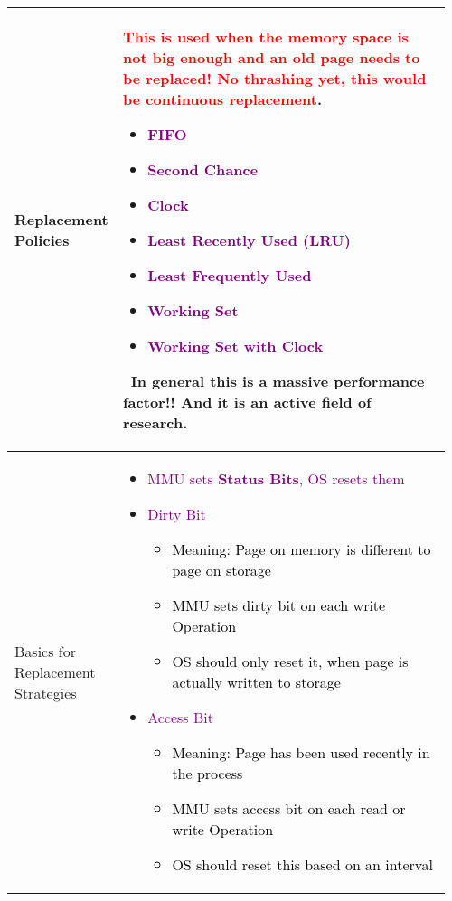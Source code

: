 \documentclass[main.tex,fontsize=8pt,paper=a4,paper=portrait,DIV=calc,]{scrartcl}
\begin{document}
\begin{table}[ht!]
\begin{tabular}{|m{0.2\linewidth}|m{0.755\linewidth}|}
\hline
Replacement Policies & 
\textcolor{red}{This is used when the memory space is not big enough and an old page needs to be replaced! \textbf{No thrashing yet, this would be continuous replacement}}.\newline
\begin{itemize}
\item \textcolor{purple}{FIFO}
\item \textcolor{purple}{Second Chance}
\item \textcolor{purple}{Clock}
\item \textcolor{purple}{Least Recently Used (LRU)}
\item \textcolor{purple}{Least Frequently Used}
\item \textcolor{purple}{Working Set}
\item \textcolor{purple}{Working Set with Clock}
\vspace{-3mm}
\end{itemize}
\, \newline
In general this is \textbf{a massive performance factor!!} And it is an active field of research.\\
\hline
Basics for Replacement Strategies &
\vspace{2mm}
\begin{itemize}
\item \textcolor{purple}{MMU sets \textbf{Status Bits}, OS resets them}
\item \textcolor{purple}{Dirty Bit}\newline
\begin{itemize}
  \item \textcolor{black}{Meaning: Page on memory is different to page on storage}
\item \textcolor{black}{MMU sets dirty bit on each write Operation}
\item \textcolor{black}{OS should only reset it, when page is actually written to storage}
\end{itemize}
\item \textcolor{purple}{Access Bit}\newline
\begin{itemize}
\item \textcolor{black}{Meaning: Page has been used recently in the process}
\item \textcolor{black}{MMU sets access bit on each read or write Operation}
\item \textcolor{black}{OS should reset this based on an interval}
\end{itemize} 

\end{itemize}
\end{tabular}
\end{table}
\end{document}
